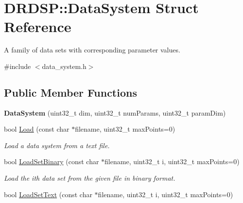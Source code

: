 \hypertarget{struct_d_r_d_s_p_1_1_data_system}{\section{D\-R\-D\-S\-P\-:\-:Data\-System Struct Reference}
\label{struct_d_r_d_s_p_1_1_data_system}
}


A family of data sets with corresponding parameter values.  




{\ttfamily \#include $<$data\-\_\-system.\-h$>$}

\subsection*{Public Member Functions}
\begin{DoxyCompactItemize}
\item 
\hypertarget{struct_d_r_d_s_p_1_1_data_system_aff122ec613cf26452c910ae884b11095}{{\bfseries Data\-System} (uint32\-\_\-t dim, uint32\-\_\-t num\-Params, uint32\-\_\-t param\-Dim)}\label{struct_d_r_d_s_p_1_1_data_system_aff122ec613cf26452c910ae884b11095}

\item 
\hypertarget{struct_d_r_d_s_p_1_1_data_system_a23b905c286750d16f9cd8996ad4c2076}{bool \hyperlink{struct_d_r_d_s_p_1_1_data_system_a23b905c286750d16f9cd8996ad4c2076}{Load} (const char $\ast$filename, uint32\-\_\-t max\-Points=0)}\label{struct_d_r_d_s_p_1_1_data_system_a23b905c286750d16f9cd8996ad4c2076}

\begin{DoxyCompactList}\small\item\em Load a data system from a text file. \end{DoxyCompactList}\item 
\hypertarget{struct_d_r_d_s_p_1_1_data_system_a1c2765c2e9a5b228dfd5c7487d67f94b}{bool \hyperlink{struct_d_r_d_s_p_1_1_data_system_a1c2765c2e9a5b228dfd5c7487d67f94b}{Load\-Set\-Binary} (const char $\ast$filename, uint32\-\_\-t i, uint32\-\_\-t max\-Points=0)}\label{struct_d_r_d_s_p_1_1_data_system_a1c2765c2e9a5b228dfd5c7487d67f94b}

\begin{DoxyCompactList}\small\item\em Load the ith data set from the given file in binary format. \end{DoxyCompactList}\item 
\hypertarget{struct_d_r_d_s_p_1_1_data_system_acf1c420d18c840b32fa5891f03253ee4}{bool \hyperlink{struct_d_r_d_s_p_1_1_data_system_acf1c420d18c840b32fa5891f03253ee4}{Load\-Set\-Text} (const char $\ast$filename, uint32\-\_\-t i, uint32\-\_\-t max\-Points=0)}\label{struct_d_r_d_s_p_1_1_data_system_acf1c420d18c840b32fa5891f03253ee4}


\end{DoxyCompactItemize}
